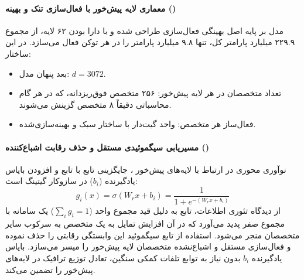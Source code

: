 \item {}

\paragraph*{معماری لایه پیش‌خور با فعال‌سازی تنک و بهینه ()}
مدل  \cite{minimax2025m2} بر پایه اصل بهینگی فعال‌سازی طراحی شده و با دارا بودن ۶۲ لایه، از مجموع ۲۲۹.۹ میلیارد پارامتر کل، تنها ۹.۸ میلیارد پارامتر را در هر توکن فعال می‌سازد. در این ساختار:
\begin{itemize}
    \item بعد پنهان مدل: $d = 3072$.
    \item تعداد متخصصان در هر لایه پیش‌خور: ۲۵۶ متخصص فوق‌ریزدانه، که در هر گام محاسباتی دقیقاً ۸ متخصص گزینش می‌شوند.
    \item فعال‌ساز هر متخصص: واحد گیت‌دار  با ساختار سبک و بهینه‌سازی‌شده.
\end{itemize}

\paragraph*{مسیریابی سیگموئیدی مستقل و حذف رقابت اشباع‌کننده ()}
نوآوری محوری در ارتباط با لایه‌های پیش‌خور ، جایگزینی تابع  با تابع  و افزودن بایاس یادگیرنده ($b_i$) در سازوکار گیتینگ است:
\begin{equation}
    g_i(x) = \sigma(W_r x + b_i) = \frac{1}{1 + e^{-(W_r x + b_i)}}
\end{equation}
از دیدگاه تئوری اطلاعات، تابع  به دلیل قید مجموع واحد ($\sum_i g_i = 1$) یک سامانه با مجموع صفر پدید می‌آورد که در آن افزایش تمایل به یک متخصص به سرکوب سایر متخصصان منجر می‌شود. استفاده از تابع سیگموئید این وابستگی رقابتی را حذف نموده و فعال‌سازی مستقل و اشباع‌نشده متخصصان لایه پیش‌خور را میسر می‌سازد. بایاس یادگیرنده $b_i$ بدون نیاز به توابع تلفات کمکی سنگین، تعادل توزیع ترافیک در لایه‌های پیش‌خور را تضمین می‌کند.

